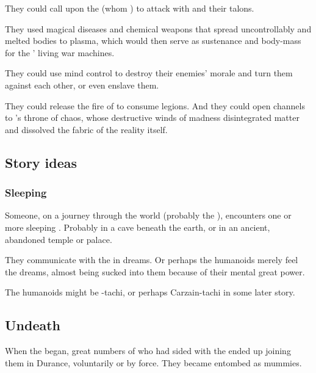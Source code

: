 They could call upon the  (whom ) to attack with  and their talons.

They used magical diseases and chemical weapons that spread uncontrollably and melted bodies to plasma, which would then serve as sustenance and body-mass for the \ophidians' living war machines. 

They could use mind control to destroy their enemies' morale and turn them against each other, or even enslave them.

They could release the fire of  to consume legions. 
And they could open channels to \RuinSatha's throne of chaos, whose destructive winds of madness disintegrated matter and dissolved the fabric of the reality itself. 









\subsection{Story ideas}
\subsubsection{Sleeping \ophidians}
Someone, on a journey through the world (probably the \Wylde{}), encounters one or more sleeping \ophidians{}. 
Probably in a cave beneath the earth, or in an ancient, abandoned temple or palace. 

They communicate with the \ophidians{} in dreams. 
Or perhaps the humanoids merely feel the \psp{\ophidians} dreams, almost being sucked into them because of their mental great power. 

The humanoids might be \Shilred-tachi, or perhaps Carzain-tachi in some later story. 









\subsection{Undeath}
When the  began, great numbers of \ophidians who had sided with the \dragons ended up joining them in Durance, voluntarily or by force. 
They became entombed as mummies.

